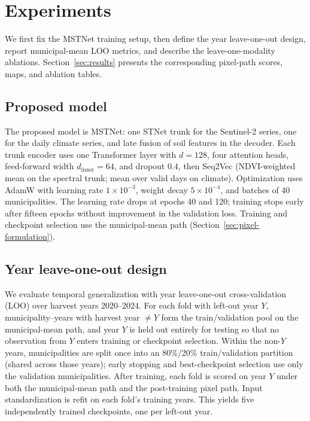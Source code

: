 \section{Experiments}
\label{sec:experiments}

We first fix the MSTNet training setup, then define the year leave-one-out design, report municipal-mean LOO metrics, and describe the leave-one-modality ablations.
Section~\ref{sec:results} presents the corresponding pixel-path scores, maps, and ablation tables.

\subsection{Proposed model}
The proposed model is MSTNet: one STNet trunk for the Sentinel-2 series, one for the daily climate series, and late fusion of soil features in the decoder.
Each trunk encoder uses one Transformer layer with $d=128$, four attention heads, feed-forward width $d_{\mathrm{inner}}=64$, and dropout $0.4$, then Seq2Vec (NDVI-weighted mean on the spectral trunk; mean over valid days on climate).
Optimization uses AdamW with learning rate $1\times10^{-3}$, weight decay $5\times10^{-4}$, and batches of 40 municipalities.
The learning rate drops at epochs 40 and 120; training stops early after fifteen epochs without improvement in the validation loss.
Training and checkpoint selection use the municipal-mean path (Section~\ref{sec:pixel-formulation}).

\subsection{Year leave-one-out design}
\label{sec:loo}
We evaluate temporal generalization with year leave-one-out cross-validation (LOO) over harvest years 2020--2024.
For each fold with left-out year $Y$, municipality--years with harvest year $\neq Y$ form the train/validation pool on the municipal-mean path, and year $Y$ is held out entirely for testing so that no observation from $Y$ enters training or checkpoint selection.
Within the non-$Y$ years, municipalities are split once into an 80\%/20\% train/validation partition (shared across those years); early stopping and best-checkpoint selection use only the validation municipalities.
After training, each fold is scored on year $Y$ under both the municipal-mean path and the post-training pixel path.
Input standardization is refit on each fold's training years.
This yields five independently trained checkpoints, one per left-out year.

